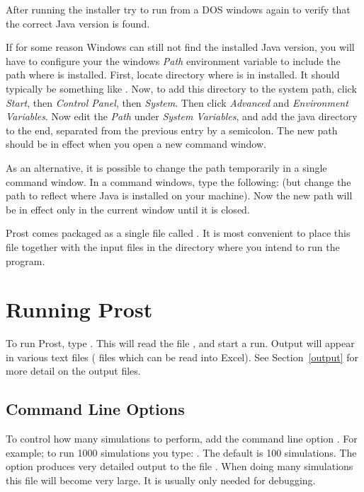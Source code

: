 \documentclass[12pt,twoside,a4paper]{article}
\begin{document}
After running the installer try to run  from a DOS windows 
again to verify that the correct Java version is found.

If for some reason Windows can still not find the installed Java version, you will
have to configure your the windows \emph{Path} environment variable to include the 
path where  is installed. First, locate directory where 
is in installed. It should typically be something like . 
Now, to add this directory to the system path, click \emph{Start}, then \emph{Control Panel}, then \emph{System}.
Then click \emph{Advanced} and \emph{Environment Variables}.
Now edit the \emph{Path} under \emph{System Variables}, and add the java directory to the end, separated from the previous
entry by a semicolon. The new path should be in effect when you open a new command window.

As an alternative, it is possible to change the path temporarily in a single command window.
In a command windows, type the following:  (but change the path to reflect where Java is installed on your machine). Now the new path will be in effect only in the current window until it is closed.

Prost comes packaged as a single file called . It is
most convenient to place this file together with the input files in
the directory where you intend to run the program.

\section{Running Prost}
\label{running}
To run Prost, type . This will read the file
, and start a run. Output will appear in various text files
( files which can be read into Excel). See Section~\ref{output} 
for more
detail on the output files.  

\subsection{Command Line Options}
\label{options}
To control how many simulations
to perform, add the command line option . 
For example;
to run 1000 simulations you type: . The
default is 100 simulations.  The option  produces very detailed
output to the file . When doing many simulations this file will
become very large. It is usually only needed for debugging.
\end{document}

